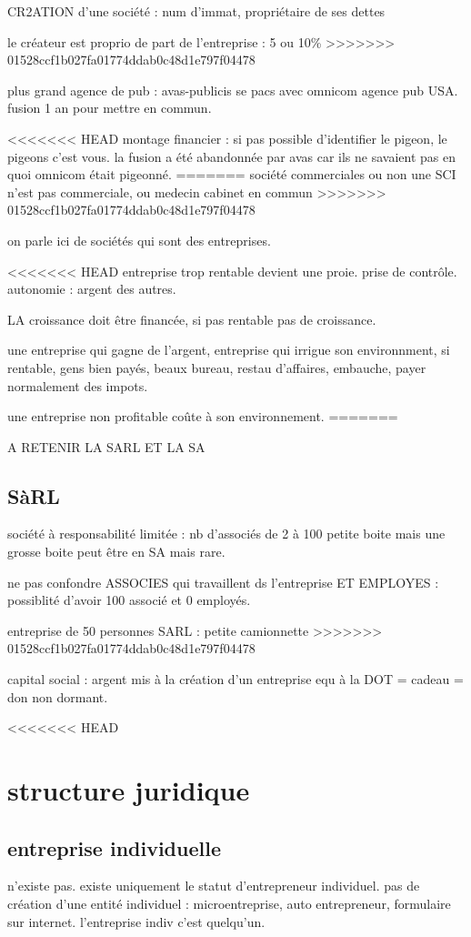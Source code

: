 \documentclass[a4paper,12pt]{article}
\begin{document}
CR2ATION d'une société : num d'immat, propriétaire de ses dettes 

le créateur est proprio de part de l'entreprise : 5 ou 10\%
>>>>>>> 01528ccf1b027fa01774ddab0c48d1e797f04478

plus grand agence de pub : avas-publicis se pacs avec omnicom agence pub USA.
fusion 1 an pour mettre en commun. 

<<<<<<< HEAD
montage financier : si pas possible d'identifier le pigeon, le pigeons c'est vous.
la fusion a été abandonnée par avas car ils ne savaient pas en quoi omnicom était pigeonné.
=======
société commerciales ou non une SCI n'est pas commerciale, ou medecin cabinet en commun
>>>>>>> 01528ccf1b027fa01774ddab0c48d1e797f04478

on parle ici de sociétés qui sont des entreprises.

<<<<<<< HEAD
entreprise trop rentable devient une proie. prise de contrôle.
autonomie : argent des autres.


LA croissance doit être financée, si pas rentable pas de croissance.

une entreprise qui gagne de l'argent, entreprise qui irrigue son environnment,
si rentable, gens bien payés, beaux bureau, restau d'affaires, embauche, payer normalement 
des impots.

une entreprise non profitable coûte à son environnement.
=======

A RETENIR LA SARL ET LA SA

\subsection{SàRL}
société à responsabilité limitée : nb d'associés  de 2 à 100
petite boite mais une grosse boite peut être en SA mais rare.

ne pas confondre ASSOCIES qui travaillent ds l'entreprise ET  EMPLOYES :
possiblité d'avoir 100 associé et 0 employés.

entreprise de 50 personnes SARL : petite camionnette
>>>>>>> 01528ccf1b027fa01774ddab0c48d1e797f04478

capital social : argent mis à la création d'un entreprise equ à la DOT = cadeau = don
non dormant.

<<<<<<< HEAD
\section{structure juridique}
\subsection{ entreprise individuelle}
 n'existe pas. existe uniquement le statut d'entrepreneur individuel.
pas de création d'une entité individuel : microentreprise, auto entrepreneur, formulaire sur internet.
l'entreprise indiv c'est quelqu'un.
\end{document}
